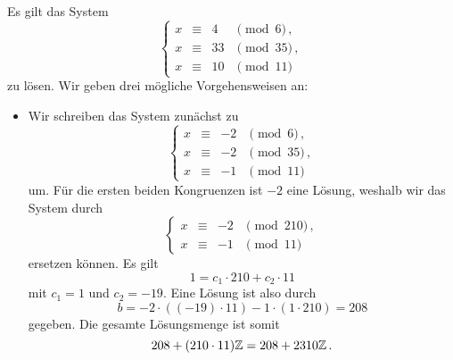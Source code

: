 Es gilt das System
\[
  \left\{
    \begin{array}{rcrl}
      x &\equiv& 4  & \pmod{6}  \,, \\
      x &\equiv& 33 & \pmod{35} \,, \\
      x &\equiv& 10 & \pmod{11}
    \end{array}
  \right.
\]
zu lösen.
Wir geben drei mögliche Vorgehensweisen an:
\begin{itemize}
  \item
    Wir schreiben das System zunächst zu
    \[
      \left\{
        \begin{array}{rcrl}
          x &\equiv& -2  & \pmod{6} \,, \\
          x &\equiv& -2 & \pmod{35} \,, \\
          x &\equiv& -1 & \pmod{11}
        \end{array}
      \right.
    \]
    um.
    Für die ersten beiden Kongruenzen ist $-2$ eine Lösung, weshalb wir das System durch
    \[
      \left\{
        \begin{array}{rcrl}
          x &\equiv& -2 & \pmod{210}  \,, \\
          x &\equiv& -1 & \pmod{11}
        \end{array}
      \right.
    \]
    ersetzen können.
    Es gilt
    \[
      1 = c_1 \cdot 210 + c_2 \cdot 11
    \]
    mit $c_1 = 1$ und $c_2 = -19$.
    Eine Lösung ist also durch
    \[
        b
      = -2 \cdot ((-19) \cdot 11) -1 \cdot (1 \cdot 210)
      = 208
    \]
    gegeben.
    Die gesamte Lösungsmenge ist somit
    \[
        208 + (210 \cdot 11) \mathbb{Z}
      = 208 + 2310 \mathbb{Z} \,.
    \]
    

\end{itemize}
